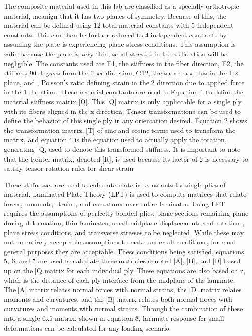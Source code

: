\documentclass[12pt]{article}
\begin{document}
The composite material used in this lab are classified as a specially orthotropic material, meanign that it has two planes of symmetry. Because of this, the material can be defined using 12 total material constants with 5 independent constants. This can then be further reduced to 4 independent constants by assuming the plate is experiencing plane stress conditions. This assumption is valid because the plate is very thin, so all stresses in the z direction will be negligible. The constants used are E{1}, the stiffness in the fiber direction, E{2}, the stiffness 90 degrees from the fiber direction, G{12}, the shear modulus in the 1-2 plane, and , Poisson's ratio defining strain in the 2 direction due to applied force in the 1 direction. These material constants are used in Equation 1 to define the material stiffness matrix [Q]. This [Q] matrix is only appliccable for a single ply with its fibers aligned in the x-direction. Tensor transformations can be used to define the behavior of this single ply in any orientation desired. Equation 2 shows the transformation matrix, [T] of sine and cosine terms used to transform the matrix, and equation 4 is the equation used to actually apply the rotation, generating \bar{Q}, used to denote this transformed stiffness. It is important to note that the Reuter matrix, denoted [R], is used because its factor of 2 is necessary to satisfy tensor rotation rules for shear strain.

These stiffnesses are used to calculate material constants for single plies of material. Laminated Plate Theory (LPT) is used to compute matrices that relate forces, moments, strains, and curvatures over entire laminates. Using LPT requires the assumptions of perfectly bonded plies, plane sections remaining plane during deformation, thin laminates, small midplane displacements and rotations, plane stress conditions, and transverse stresses to be neglected. While these may not be entirely acceptable assumptions to make under all conditions, for most general purposes they are acceptable. These conditions being satisfied, equations 5, 6, and 7 are used to calculate three matricies denoted [A], [B], and [D] based up on the \bar{Q} matrix for each individual ply. These equations are also based on z, which is the distance of each ply interface from the midplane of the laminate. The [A] matrix relates normal forces with normal strains, the [D] matrix relates moments and curvatures, and the [B] matrix relates both normal forces with curvatures and moments with normal strains. Through the combination of these into a single 6x6 matrix, shown in equation 8, laminate response for small deformations can be calculated for any loading scenario.
\end{document}
